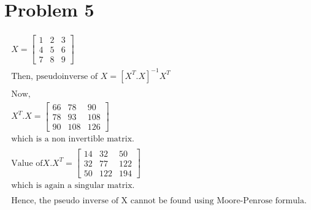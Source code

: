 \documentclass[12pt]{article}
\begin{document}
\section*{Problem 5}
\begin{gather*}
    X = \left[
                {\begin{array}{ccc}
                     1&2&3  \\
                     4&5&6  \\
                     7&8&9
                \end{array}} \right
             ]\\
    \text{Then, pseudoinverse of $X = {[X^T.X]}^{-1}X^T$}\\\\
    \text{Now,}\\
    X^T.X = \left[
                {\begin{array}{ccc}
                     66&78&90  \\
                     78&93&108  \\
                     90&108&126
                \end{array}} \right
             ]\\
    \text{which is a non invertible matrix.}\\\\
    \text{Value of}
    X.X^T = \left[
                {\begin{array}{ccc}
                     14&32&50  \\
                     32&77&122  \\
                     50&122&194
                \end{array}} \right
             ]\\
    \text{which is again a singular matrix.}\\\\
    \text{Hence, the pseudo inverse of X cannot be found using Moore-Penrose formula.}
\end{gather*}
\end{document}
